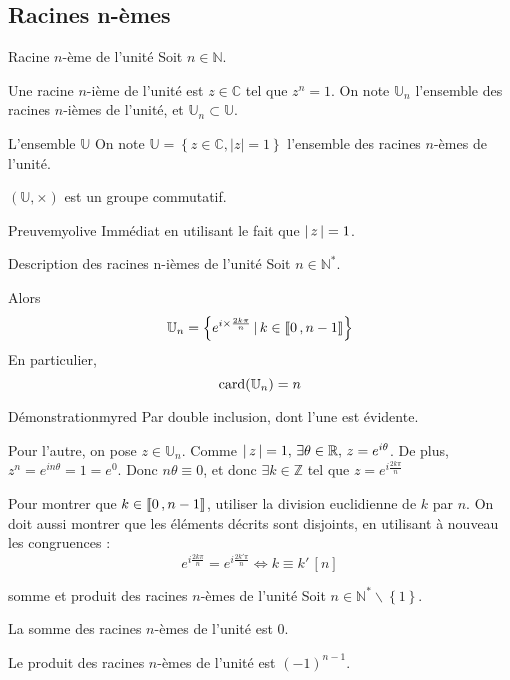 \subsection{Racines n-èmes}

    \begin{defi}{Racine $n$-ème de l’unité}{}
	    Soit $n \in \mathbb{N}$. 
	
	    Une racine $n$-ième de l’unité est $z \in \mathbb{C}$ tel que $z^{n}=1$. On note $\mathbb{U}_n$ l’ensemble des racines $n$-ièmes de l’unité, et $\mathbb{U}_n \subset \mathbb{U}$.
    \end{defi}

    \begin{prop}{L’ensemble $\mathbb{U}$}{}
        On note $\mathbb{U} = \left\{z \in \mathbb{C}, |z| = 1\right\}$ l’ensemble des racines $n$-èmes de l’unité.

        $(\mathbb{U},\times)$ est un groupe commutatif.
    \end{prop}

    \begin{demo}{Preuve}{myolive}
		Immédiat en utilisant le fait que $\left\lvert \,z \, \right\rvert = 1$.
	\end{demo}

    \begin{theo}{Description des racines n-ièmes de l’unité}{}
        Soit $n \in \mathbb{N}^*$.
    
        Alors \[ \mathbb{U}_n = \left\{ e^{i \times \frac{2k \pi}{n}} \,|\, k \in \left\llbracket 0 \, , n-1 \right\rrbracket \right\} \]
        En particulier, \[ \operatorname{card}(\mathbb{U}_n) = n \]
    \end{theo}

    \begin{demo}{Démonstration}{myred}
		Par double inclusion, dont l’une est évidente.

	Pour l’autre, on pose $z \in \mathbb{U}_n$. Comme $\left\lvert \,z \, \right\rvert = 1, \, \exists \theta \in \mathbb{R}, \, z = e^{i\theta}$. De plus, $z^n = e^{i n \theta} =1 = e^0$. Donc $n \theta \equiv 0$, et donc $\exists k \in \mathbb{Z}$ tel que $z = e^{i \frac{2k \pi}{n}}$

	Pour montrer que $k \in \left\llbracket 0 \, , n-1 \right\rrbracket$, utiliser la division euclidienne de $k$ par $n$. On doit aussi montrer que les éléments décrits sont disjoints, en utilisant à nouveau les congruences :
	\[ e^{i\frac{2k\pi}{n}} = e^{i \frac{2 k' \pi}{n}} \iff k \equiv k' \, [n] \]
	\end{demo}

    \begin{coro}{somme et produit des racines $n$-èmes de l’unité}{}
        Soit $n \in \mathbb{N}^* \backslash \left\{ 1\right\}$.
    
        \begin{alors}
            \item La somme des racines $n$-èmes de l’unité est 0.
            \item Le produit des racines $n$-èmes de l’unité est $(-1)^{n-1}$.
        \end{alors}
    \end{coro}

